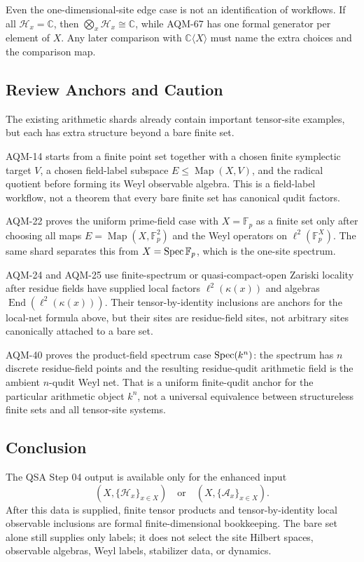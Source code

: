 Even the one-dimensional-site edge case is not an identification of
workflows.  If all \(\mathcal H_x=\mathbb C\), then
\(\bigotimes_x\mathcal H_x\cong\mathbb C\), while AQM-67 has one formal
generator per element of \(X\).  Any later comparison with
\(\mathbb C\langle X\rangle\) must name the extra choices and the comparison
map.

\subsection{Review Anchors and Caution}

The existing arithmetic shards already contain important tensor-site examples,
but each has extra structure beyond a bare finite set.

AQM-14 starts from a finite point set together with a chosen finite symplectic
target \(V\), a chosen field-label subspace
\(E\leq\operatorname{Map}(X,V)\), and the radical quotient before forming its
Weyl observable algebra.  This is a field-label workflow, not a theorem that
every bare finite set has canonical qudit factors.

AQM-22 proves the uniform prime-field case with \(X=\mathbb F_p\) as a
finite set only after choosing all maps \(E=\operatorname{Map}(X,\mathbb
F_p^2)\) and the Weyl operators on \(\ell^2(\mathbb F_p^X)\).  The same shard
separates this from \(X=\operatorname{Spec}\mathbb F_p\), which is the one-site spectrum.

AQM-24 and AQM-25 use finite-spectrum or quasi-compact-open Zariski locality
after residue fields have supplied local factors
\(\ell^2(\kappa(x))\) and algebras
\(\operatorname{End}(\ell^2(\kappa(x)))\).  Their tensor-by-identity
inclusions are anchors for the local-net formula above, but their sites are
residue-field sites, not arbitrary sites canonically attached to a bare set.

AQM-40 proves the product-field spectrum case
\(\operatorname{Spec}(k^n)\): the spectrum has \(n\) discrete residue-field points and the
resulting residue-qudit arithmetic field is the ambient \(n\)-qudit Weyl
net.  That is a uniform finite-qudit anchor for the particular arithmetic
object \(k^n\), not a universal equivalence between structureless finite sets
and all tensor-site systems.

\subsection{Conclusion}

The QSA Step 04 output is available only for the enhanced input
\[
  (X,\{\mathcal H_x\}_{x\in X})
  \quad\text{or}\quad
  (X,\{\mathcal A_x\}_{x\in X}).
\]
After this data is supplied, finite tensor products and tensor-by-identity
local observable inclusions are formal finite-dimensional bookkeeping.  The
bare set alone still supplies only labels; it does not select the site
Hilbert spaces, observable algebras, Weyl labels, stabilizer data, or
dynamics.
